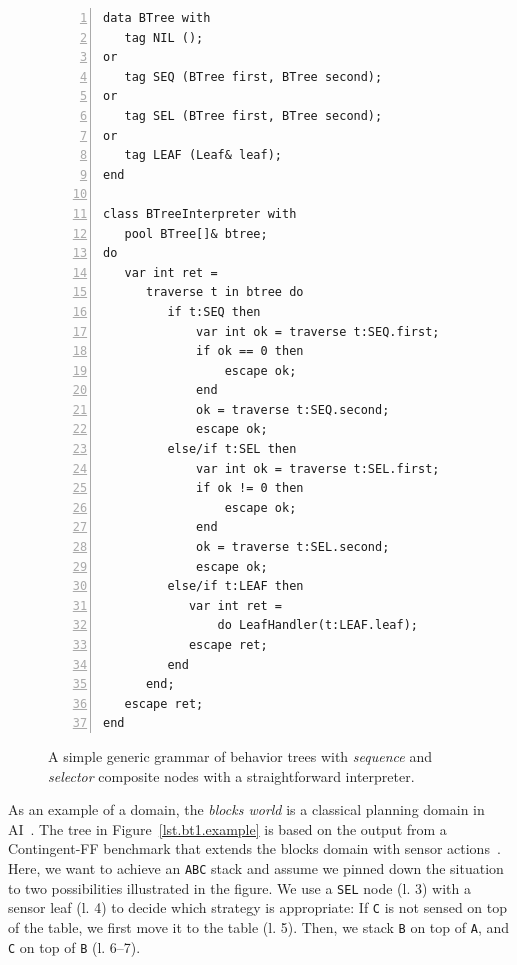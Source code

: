 \documentclass{sig-alternate}
\newcommand{\code}[1] {{\small{\texttt{#1}}}}
\begin{document}
\begin{figure}[t]
\begin{lstlisting}[numbers=left,xleftmargin=3em]
data BTree with
   tag NIL ();
or
   tag SEQ (BTree first, BTree second);
or
   tag SEL (BTree first, BTree second);
or
   tag LEAF (Leaf& leaf);
end

class BTreeInterpreter with
   pool BTree[]& btree;
do
   var int ret =
      traverse t in btree do
         if t:SEQ then
             var int ok = traverse t:SEQ.first;
             if ok == 0 then
                 escape ok;
             end
             ok = traverse t:SEQ.second;
             escape ok;
         else/if t:SEL then
             var int ok = traverse t:SEL.first;
             if ok != 0 then
                 escape ok;
             end
             ok = traverse t:SEL.second;
             escape ok;
         else/if t:LEAF then
            var int ret =
                do LeafHandler(t:LEAF.leaf);
            escape ret;
         end
      end;
   escape ret;
end
\end{lstlisting}
\caption{
A simple generic grammar of behavior trees with \emph{sequence} and 
\emph{selector} composite nodes with a straightforward interpreter.
\label{lst.bt1}
}
\end{figure}

As an example of a domain, the \emph{blocks world} is a classical planning 
domain in AI~\cite{slaney2001blocks}.
%
The tree in Figure~\ref{lst.bt1.example} is based on the output from a
Contingent-FF benchmark that extends the blocks domain with sensor 
actions~\cite{hoffmann2005contingent}.
%
%
Here, we want to achieve an \code{ABC} stack and assume we pinned down the 
situation to two possibilities illustrated in the figure.
%
We use a \code{SEL} node (l. 3) with a sensor leaf (l. 4) to decide which 
strategy is appropriate:
If \code{C} is not sensed on top of the table, we first move it to the table 
(l. 5).
Then, we stack \code{B} on top of \code{A}, and \code{C} on top of \code{B} 
(l. 6--7).

\end{document}
